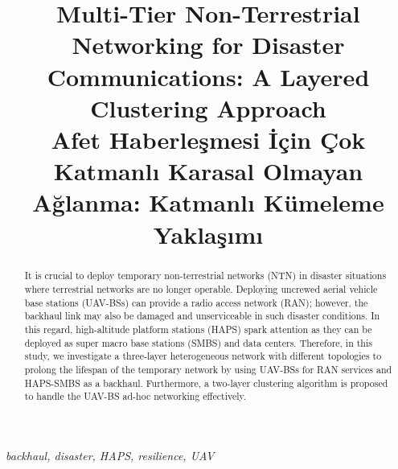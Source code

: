 \documentclass[conference, a4paper]{IEEEtran}
\begin{document}
\title{Multi-Tier Non-Terrestrial Networking for Disaster Communications: A Layered Clustering Approach \\ 
Afet Haberleşmesi İçin Çok Katmanlı Karasal Olmayan Ağlanma: Katmanlı Kümeleme Yaklaşımı}


\author{
{}}
\maketitle

\begin{abstract}
It is crucial to deploy temporary non-terrestrial networks (NTN) in disaster situations where terrestrial networks are no longer operable. 
Deploying uncrewed aerial vehicle base stations (UAV-BSs) can provide a radio access network (RAN); however, the backhaul link may also be damaged and unserviceable in such disaster conditions. 
In this regard, high-altitude platform stations (HAPS) spark attention as they can be deployed as super macro base stations (SMBS) and data centers. 
Therefore, in this study, we investigate a three-layer heterogeneous network with different topologies to prolong the lifespan of the temporary network by using UAV-BSs for RAN services and HAPS-SMBS as a backhaul.
Furthermore, a two-layer clustering algorithm is proposed to handle the UAV-BS ad-hoc networking effectively.
\end{abstract}
\begin{IEEEkeywords}
\textit{backhaul, disaster, HAPS, resilience, UAV}
\end{IEEEkeywords}


\end{document}
